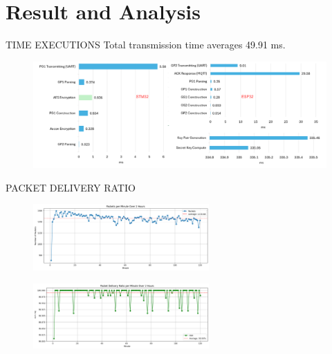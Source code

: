 \section{Result and Analysis}
\begin{frame}{TIME EXECUTIONS}
	Total transmission time averages 49.91 ms.
	\vspace{-0.2cm}
	\begin{figure}
		\centering
		\includegraphics[width=1\textwidth]{pic/res_time.pdf}
	\end{figure}
\end{frame}

\begin{frame}{PACKET DELIVERY RATIO}
	\begin{figure}
		\centering
		\includegraphics[width=0.6\textwidth]{pic/packet.png}
	\end{figure}
	\begin{figure}
		\centering
		\includegraphics[width=0.6\textwidth]{pic/pdr.png}
	\end{figure}
\end{frame}

